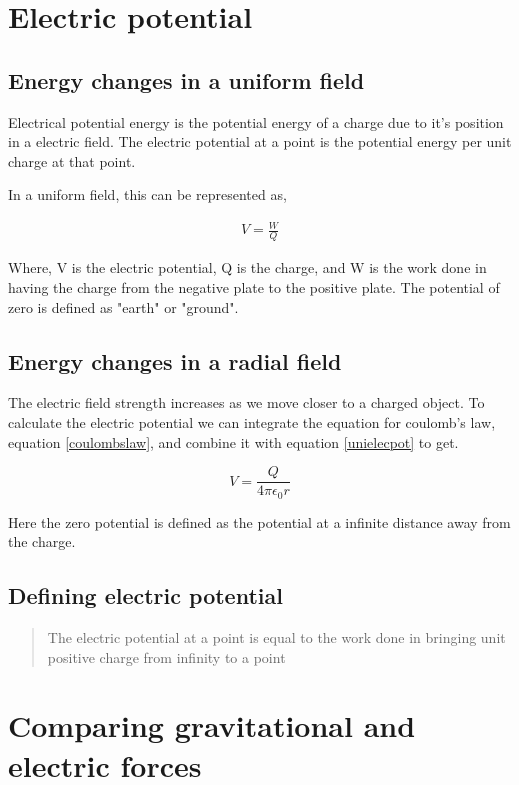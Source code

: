 \documentclass{scrbook}
\begin{document}
\section{Electric potential}

\subsection{Energy changes in a uniform field}

	Electrical potential energy is the potential energy of a charge due to it's position in a electric field. The electric potential at a point is the potential energy per unit charge at that point.

	In a uniform field, this can be represented as,

	\begin{align}
		V = \frac{W}{Q} \label{unielecpot}
	\end{align}
	
	Where, V is the electric potential, Q is the charge, and W is the work done in having the charge from the negative plate to the positive plate. The potential of zero is defined as "earth" or "ground".

\subsection{Energy changes in a radial field}

	The electric field strength increases as we move closer to a charged object. To calculate the electric potential we can integrate the equation for coulomb's law, equation \ref{coulombslaw}, and combine it with equation \ref{unielecpot} to get.

	\[ V = \frac{Q}{4\pi \epsilon_0 r} \]

	Here the zero potential is defined as the potential at a infinite distance away from the charge.

\subsection{Defining electric potential}

	\begin{quote}
		The electric potential at a point is equal to the work done in bringing unit positive charge from infinity to a point
	\end{quote}

\section{Comparing gravitational and electric forces}
\end{document}
